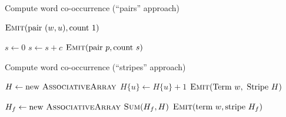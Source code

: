 \begin{algorithm}[p]
\caption{Compute word co-occurrence (``pairs'' approach)}
\label{algorithm:chapter3:coocur:pairs}

\algrenewcommand{}
\algrenewcommand{}
  \begin{algorithmic}[1]
    \State $\textsc{Emit}(\textrm{pair }(w,u), \textrm{count }1)$
    \EndFor
    \EndFor
    \EndProcedure
    \EndFunction
  \end{algorithmic}

  \begin{algorithmic}[1]
    \State $s \gets 0$
    \State $s \gets s + c$
    \EndFor
    \State $\textsc{Emit}(\textrm{pair }p, \textrm{count }s)$
    \EndProcedure
    \EndFunction
  \end{algorithmic}
\end{algorithm}

\begin{algorithm}[p]
\caption{Compute word co-occurrence (``stripes'' approach)}
\label{algorithm:chapter3:coocur:stripes}

\algrenewcommand{}
\algrenewcommand{}
  \begin{algorithmic}[1]
    \State $H \gets \textrm{new }\textsc{AssociativeArray}$
    \State $H\{u\} \gets H\{u\} + 1$
    \EndFor
    \State $\textsc{Emit}(\textrm{Term }w, \textrm{ Stripe }H)$
    \EndFor
    \EndProcedure
    \EndFunction
  \end{algorithmic}

  \begin{algorithmic}[1]
    \State $H_f \gets \textrm{new }\textsc{AssociativeArray}$
    \State $\textsc{Sum}(H_f,H)$
    \EndFor
    \State $\textsc{Emit}(\textrm{term }w, \textrm{stripe }H_f)$
    \EndProcedure
    \EndFunction
  \end{algorithmic}
\end{algorithm}

